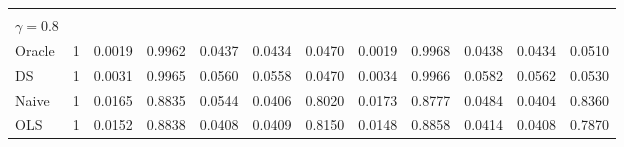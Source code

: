 \begin{tabular}{llllllllllll}
  \multicolumn{1}{r}{} &
  \multicolumn{1}{r}{} &
  \multicolumn{1}{r}{} &
  \multicolumn{1}{r}{} &
  \multicolumn{1}{r}{} &
  \multicolumn{1}{r}{} &
  \multicolumn{1}{r}{} &
  \multicolumn{1}{r}{} \\
\multicolumn{1}{l}{$\gamma = 0.8$} &
  \multicolumn{1}{|r}{} &
  \multicolumn{1}{r}{} &
  \multicolumn{1}{r}{} &
  \multicolumn{1}{r}{} &
  \multicolumn{1}{r}{} &
  \multicolumn{1}{r}{} &
  \multicolumn{1}{r}{} &
  \multicolumn{1}{r}{} &
  \multicolumn{1}{r}{} &
  \multicolumn{1}{r}{} &
  \multicolumn{1}{r}{} \\
\multicolumn{1}{l}{\hspace{1em}Oracle} &
  \multicolumn{1}{|r}{1} &
  \multicolumn{1}{r}{0.0019} &
  \multicolumn{1}{r}{0.9962} &
  \multicolumn{1}{r}{0.0437} &
  \multicolumn{1}{r}{0.0434} &
  \multicolumn{1}{r}{0.0470} &
  \multicolumn{1}{r}{0.0019} &
  \multicolumn{1}{r}{0.9968} &
  \multicolumn{1}{r}{0.0438} &
  \multicolumn{1}{r}{0.0434} &
  \multicolumn{1}{r}{0.0510} \\
\multicolumn{1}{l}{\hspace{1em}DS} &
  \multicolumn{1}{|r}{1} &
  \multicolumn{1}{r}{0.0031} &
  \multicolumn{1}{r}{0.9965} &
  \multicolumn{1}{r}{0.0560} &
  \multicolumn{1}{r}{0.0558} &
  \multicolumn{1}{r}{0.0470} &
  \multicolumn{1}{r}{0.0034} &
  \multicolumn{1}{r}{0.9966} &
  \multicolumn{1}{r}{0.0582} &
  \multicolumn{1}{r}{0.0562} &
  \multicolumn{1}{r}{0.0530} \\
\multicolumn{1}{l}{\hspace{1em}Naive} &
  \multicolumn{1}{|r}{1} &
  \multicolumn{1}{r}{0.0165} &
  \multicolumn{1}{r}{0.8835} &
  \multicolumn{1}{r}{0.0544} &
  \multicolumn{1}{r}{0.0406} &
  \multicolumn{1}{r}{0.8020} &
  \multicolumn{1}{r}{0.0173} &
  \multicolumn{1}{r}{0.8777} &
  \multicolumn{1}{r}{0.0484} &
  \multicolumn{1}{r}{0.0404} &
  \multicolumn{1}{r}{0.8360} \\
\multicolumn{1}{l}{\hspace{1em}OLS} &
  \multicolumn{1}{|r}{1} &
  \multicolumn{1}{r}{0.0152} &
  \multicolumn{1}{r}{0.8838} &
  \multicolumn{1}{r}{0.0408} &
  \multicolumn{1}{r}{0.0409} &
  \multicolumn{1}{r}{0.8150} &
  \multicolumn{1}{r}{0.0148} &
  \multicolumn{1}{r}{0.8858} &
  \multicolumn{1}{r}{0.0414} &
  \multicolumn{1}{r}{0.0408} &
  \multicolumn{1}{r}{0.7870} \\
\cline{1-12}
\end{tabular}

